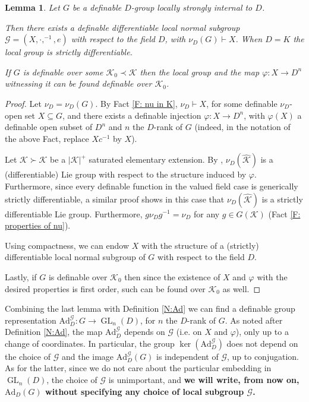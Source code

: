 \documentclass[11pt]{amsart}
\DeclareMathOperator{\gl}{GL} \DeclareMathOperator{\agl}{AGL}
\newtheorem{lemma}[theorem]{Lemma}
\theoremstyle{definition}
\newcommand{\CK}{{\mathcal K}}
\newcommand{\CG}{{\mathcal G}}
\newcommand{\0}{\emptyset}
\newcommand{\ad}{\mathrm{Ad}}
\def\sub{\subseteq}
\begin{document}
\begin{lemma}\label{L:existence of local group}
    Let $G$ be a definable $D$-group locally strongly internal to $D$.
    
    Then there exists a definable  differentiable local normal subgroup $\CG=(X,\cdot, ^{-1},e)$ with respect to the field $D$, with $\nu_D(G)\vdash X$. When $D=K$ the local group is strictly differentiable.

    If $G$ is definable over some $\CK_0\prec \CK$ then the local group and the map $\varphi:X\to D^n$ witnessing it can be found definable over $\CK_0$.
\end{lemma}
\begin{proof}
     Let $\nu_D=\nu_D(G)$. By Fact \ref{F: nu in K},  $\nu_D\vdash X$, for some definable $\nu_D$-open set $X\sub G$, and there exists a definable injection $\varphi:  X\to D^n$, with $\varphi(X)$ a definable open subset of $D^n$ and $n$ the $D$-rank of $G$ (indeed, in the notation of the above Fact, replace $Xc^{-1}$ by $X$).
     
     Let $\widehat \CK\succ \CK$ be a $|\CK|^+$ saturated elementary extension. By \cite[Theorem 7.4(1,2), Theorem 7.7(1), Theorem 7.11(1)]{HaHaPeGps}, $\nu_D(\widehat \CK)$ is a (differentiable) Lie group with respect to the structure induced  by $\varphi$. Furthermore, since every definable function in the valued field case is generically strictly differentiable, a similar proof shows in this case that $\nu_D(\widehat \CK)$ is a strictly differentiable Lie group. Furthermore,  $g\nu_D g^{-1}=\nu_D$ for any $g\in G(\CK)$ (Fact \ref{F: properties of nu}).

     
     Using  compactness,  we can endow $X$ with the structure of a (strictly) differentiable local normal subgroup of $G$ with respect to the field $D$.

     Lastly, if $G$ is definable over $\CK_0$ then since the existence of $X$ and $\varphi$ with the desired properties is first order, such can be found over $\CK_0$ as well.
\end{proof}

Combining the last lemma with Definition \ref{N:Ad} we can find a definable group representation $\ad_D^\CG: G\to \gl_n(D)$,  for $n$ the $D$-rank of $G$. As noted after Definition \ref{N:Ad},  the map $\ad_D^\CG$ depends on $\CG$ (i.e. on $X$ and $\varphi$), only up to a change of coordinates. In particular, the group $\ker(\ad^\CG_D)$  does not depend on the choice of $\CG$ and the image $\ad_D^\CG(G)$ is independent of  $\CG$, up to conjugation.  As for the latter, since we do not care about the particular embedding in $\gl_n(D)$,  the choice of $\CG$ is unimportant, and \textbf{we will write, from now on, $\ad_D(G)$ without specifying any choice of local subgroup $\CG$.}    
\end{document}
